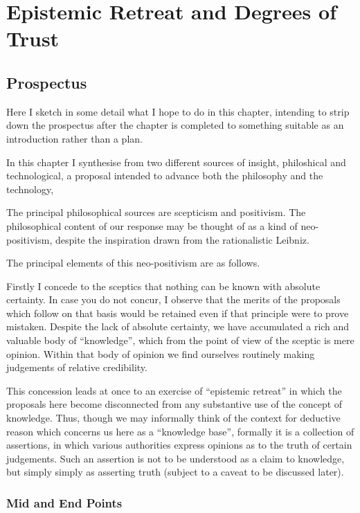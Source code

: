 
\chapter{Epistemic Retreat and Degrees of Trust}\label{EpistemicRetreat}

\section{Prospectus}

Here I sketch in some detail what I hope to do in this chapter,
intending to strip down the prospectus after the chapter is completed
to something suitable as an introduction rather than a plan.

In this chapter I synthesise from two different sources of insight,
philoshical and technological, a proposal intended to advance both
the philosophy and the technology,

The principal philosophical sources are scepticism and positivism.
The philosophical content of our response may be thought of as a kind
of neo-positivism, despite the inspiration drawn from the rationalistic Leibniz.

The principal elements of this neo-positivism are as follows.

Firstly I concede to the sceptics that nothing can be known
with absolute certainty.
In case you do not concur, I observe that the merits of the proposals
which follow on that basis would be retained even if that principle
were to prove mistaken.
Despite the lack of absolute certainty, we have accumulated a rich
and valuable body of ``knowledge'', which from the point of view of
the sceptic is mere opinion.
Within that body of opinion we find ourselves routinely making judgements
of relative credibility.

This concession leads at once to an exercise of ``epistemic retreat'' in which
the proposals here become disconnected from any substantive use of the
concept of knowledge.
Thus, though we may informally think of the context for deductive reason which
concerns us here as a ``knowledge base'', formally it is a collection of assertions,
in which various authorities express opinions as to the truth of certain
judgements.
Such an assertion is not to be understood as a claim to knowledge, but
simply simply as asserting truth (subject to a caveat to be discussed later).

\subsection{Mid and End Points}

